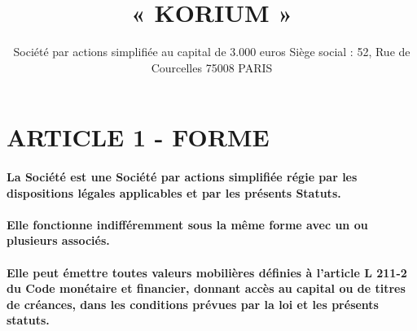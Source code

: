 \documentclass[a4paper, 11pt]{article}
\begin{document}
\title{« KORIUM »}
\author{
  Société par actions simplifiée au capital de 3.000 euros\vspace{1em}
  Siège social : 52, Rue de Courcelles\vspace{1em}
  75008 PARIS\vspace{1em}
}

\maketitle

\section*{ARTICLE 1 - FORME}

\paragraph{
  La Société est une Société par actions simplifiée régie par les dispositions  légales applicables et par les présents Statuts.
}

\paragraph{
  Elle fonctionne indifféremment sous la même forme avec un ou plusieurs associés.
}

\paragraph{
  Elle peut émettre toutes valeurs mobilières définies à l'article L 211-2 du Code monétaire et financier, donnant accès au capital ou de titres de créances, dans les conditions prévues par la loi et les présents statuts.
}
\end{document}
